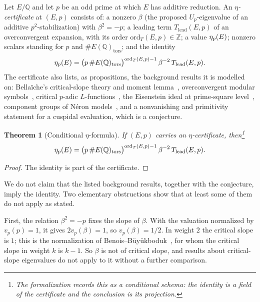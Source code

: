 \documentclass[11pt]{article}
\newtheorem{theorem}{Theorem}[section]
\theoremstyle{definition}
\newcommand{\Q}{\mathbb{Q}}
\newcommand{\Z}{\mathbb{Z}}
\newcommand{\tors}{\operatorname{tors}}
\begin{document}
\begin{definition}\label{def:closure:eta-published-imports}
Let $E/\Q$ and let $p$ be an odd prime at which $E$ has additive reduction.
An \emph{$\eta$-certificate} at $(E,p)$ consists of: a nonzero $\beta$
(the proposed $U_p$-eigenvalue of an additive $p^2$-stabilization) with
$\beta^2=-p$; a leading term $T_{\mathrm{lead}}(E,p)$ of an overconvergent
expansion, with its order $\mathrm{ord}_T(E,p)\in\Z$; a value
$\eta_p(E)$; nonzero scalars standing for $p$ and $\#E(\Q)_{\tors}$; and
the identity
\[
  \etap(E)
  =
  \bigl(p\,\#E(\Q)_{\tors}\bigr)^{\mathrm{ord}_T(E,p)-1}
  \,\beta^{-2}\,
  T_{\mathrm{lead}}(E,p).
\]
The certificate also lists, as propositions, the background results it
is modelled on: Bella\"iche's critical-slope theory and moment
lemma~\citep{Bellaiche2012}, overconvergent modular
symbols~\citep{PollackStevens2011,ColemanMazur1998}, critical $p$-adic
$L$-functions~\citep{BenoisBuyukboduk2024}, the Eisenstein ideal at
prime-square level~\citep{LangWake2025}, component groups of N\'eron
models~\citep{Lorenzini1993,Ling1997}, and a nonvanishing and primitivity
statement for a cuspidal evaluation, which is a conjecture.
\end{definition}

\begin{theorem}[Conditional $\eta$-formula]\label{thm:closure:oc-eta-formula}
If $(E,p)$ carries an $\eta$-certificate, then\footnote{The formalization records this as a conditional schema: the
identity is a field of the certificate and the conclusion is its
projection.}
\[
  \etap(E)
  =
  \bigl(p\,\#E(\Q)_{\tors}\bigr)^{\mathrm{ord}_T(E,p)-1}
  \,\beta^{-2}\,
  T_{\mathrm{lead}}(E,p).
\]
\end{theorem}

\begin{proof}
The identity is part of the certificate.
\end{proof}

We do not claim that the listed background results, together with the
conjecture, imply the identity.  Two elementary obstructions show that at
least some of them do not apply as stated.

First, the relation $\beta^2=-p$ fixes the slope of $\beta$.  With the
valuation normalized by $v_p(p)=1$, it gives $2v_p(\beta)=1$, so
$v_p(\beta)=1/2$.  In weight $2$ the critical slope is $1$; this is the
normalization of Benois--B\"uy\"ukboduk~\citep{BenoisBuyukboduk2024}, for
whom the critical slope in weight $k$ is $k-1$.  So $\beta$ is not of
critical slope, and results about critical-slope eigenvalues do not apply
to it without a further comparison.
\end{document}
